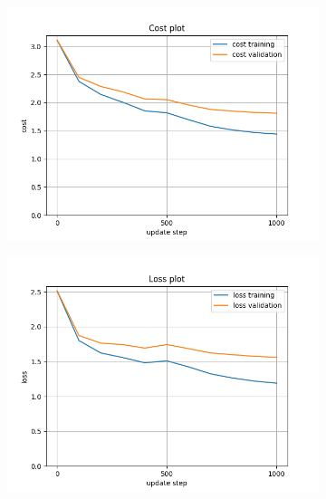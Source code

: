 \documentclass[12pt, a4paper]{article}
\begin{document}
\begin{figure}[H]
    \centering
    \begin{subfigure}{0.45\textwidth}
        \centering
        \includegraphics[width=\textwidth]{results/1-500cost.png}
    \end{subfigure}
    \hfill
    \begin{subfigure}{0.45\textwidth}
        \centering
        \includegraphics[width=\textwidth]{results/1-500loss.png}
    \end{subfigure}
    \hfill
    \begin{subfigure}{0.45\textwidth}
        \centering

\end{subfigure}
\end{figure}
\end{document}
